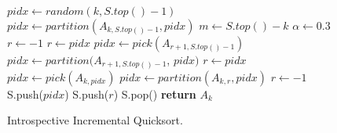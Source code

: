 \begin{figure}[!t]
\begin{algorithmic}[1]
	\State $pidx \gets random(k,S.top()-1)$
	\State $pidx \gets partition(A_{k,S.top()-1}, pidx)$
	\State $m \gets S.top() - k$
	\State $\alpha \gets 0.3$
	\State $r \gets -1$
		\State $r \gets pidx$
		\State $pidx \gets pick(A_{r+1,S.top()-1})$
		\State $pidx \gets partition(A_{r+1,S.top()-1}$,
		\State \phantom{$pidx \gets partition$} $pidx)$
		\State $r \gets pidx$
		\State $pidx \gets pick(A_{k,pidx})$
		\State $pidx \gets partition(A_{k,r}, pidx)$
		\State $r \gets -1$
	\EndIf
	\State S.push($pidx$)
		\State S.push($r$)
	\EndIf
\EndWhile
\State S.pop()
\State \textbf{return} $A_{k}$\label{IIQS_main_cycle}
\EndProcedure
\end{algorithmic}
\caption{Introspective Incremental Quicksort.}\label{isiqs}
\end{figure}

